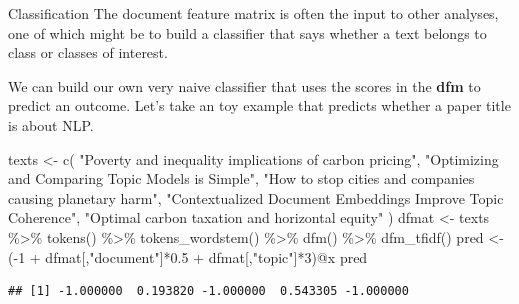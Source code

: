 \documentclass[
  10pt,
  ignorenonframetext,
  aspectratio=169]{beamer}
\newenvironment{Shaded}{\begin{snugshade}}{\end{snugshade}}
\newcommand{\DecValTok}[1]{\textcolor[rgb]{0.86,0.86,0.80}{#1}}
\newcommand{\FloatTok}[1]{\textcolor[rgb]{0.75,0.75,0.82}{#1}}
\newcommand{\FunctionTok}[1]{\textcolor[rgb]{0.94,0.94,0.56}{#1}}
\newcommand{\NormalTok}[1]{\textcolor[rgb]{0.80,0.80,0.80}{#1}}
\newcommand{\OtherTok}[1]{\textcolor[rgb]{0.94,0.94,0.56}{#1}}
\newcommand{\SpecialCharTok}[1]{\textcolor[rgb]{0.86,0.64,0.64}{#1}}
\newcommand{\StringTok}[1]{\textcolor[rgb]{0.80,0.58,0.58}{#1}}
\begin{document}
\begin{frame}[fragile]{Classification}
\protect\hypertarget{classification}{}
The document feature matrix is often the input to other analyses, one of
which might be to build a classifier that says whether a text belongs to
class or classes of interest.

We can build our own very naive classifier that uses the scores in the
\textbf{dfm} to predict an outcome. Let's take an toy example that
predicts whether a paper title is about NLP.

\scriptsize

\begin{Shaded}
\begin{Highlighting}[]
\NormalTok{texts }\OtherTok{\textless{}{-}} \FunctionTok{c}\NormalTok{(}
  \StringTok{"Poverty and inequality implications of carbon pricing"}\NormalTok{,}
  \StringTok{"Optimizing and Comparing Topic Models is Simple"}\NormalTok{,}
  \StringTok{"How to stop cities and companies causing planetary harm"}\NormalTok{,}
  \StringTok{"Contextualized Document Embeddings Improve Topic Coherence"}\NormalTok{,}
  \StringTok{"Optimal carbon taxation and horizontal equity"}
\NormalTok{)}
\NormalTok{dfmat }\OtherTok{\textless{}{-}}\NormalTok{ texts }\SpecialCharTok{\%\textgreater{}\%}
  \FunctionTok{tokens}\NormalTok{() }\SpecialCharTok{\%\textgreater{}\%}
  \FunctionTok{tokens\_wordstem}\NormalTok{() }\SpecialCharTok{\%\textgreater{}\%} 
  \FunctionTok{dfm}\NormalTok{() }\SpecialCharTok{\%\textgreater{}\%}
  \FunctionTok{dfm\_tfidf}\NormalTok{()}
\NormalTok{pred }\OtherTok{\textless{}{-}}\NormalTok{ (}\SpecialCharTok{{-}}\DecValTok{1} \SpecialCharTok{+}\NormalTok{ dfmat[,}\StringTok{"document"}\NormalTok{]}\SpecialCharTok{*}\FloatTok{0.5} \SpecialCharTok{+}\NormalTok{ dfmat[,}\StringTok{"topic"}\NormalTok{]}\SpecialCharTok{*}\DecValTok{3}\NormalTok{)}\SpecialCharTok{@}\NormalTok{x}
\NormalTok{pred}
\end{Highlighting}
\end{Shaded}

\begin{verbatim}
## [1] -1.000000  0.193820 -1.000000  0.543305 -1.000000
\end{verbatim}
\end{frame}
\end{document}
